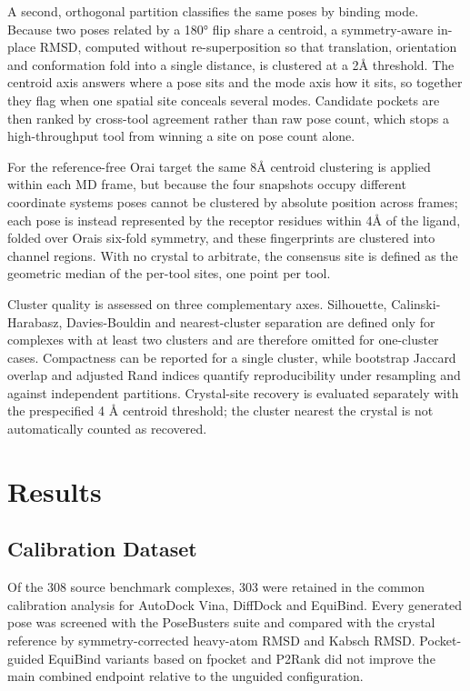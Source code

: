 A second, orthogonal partition classifies the same poses by binding mode. Because two poses related by a 180° flip share a centroid, a symmetry-aware in-place RMSD, computed without re-superposition so that translation, orientation and conformation fold into a single distance, is clustered at a 2Å threshold. The centroid axis answers where a pose sits and the mode axis how it sits, so together they flag when one spatial site conceals several modes. Candidate pockets are then ranked by cross-tool agreement rather than raw pose count, which stops a high-throughput tool from winning a site on pose count alone.

For the reference-free Orai target the same 8Å centroid clustering is applied within each MD frame, but because the four snapshots occupy different coordinate systems poses cannot be clustered by absolute position across frames; each pose is instead represented by the receptor residues within 4Å of the ligand, folded over Orai\textquotesingle s six-fold symmetry, and these fingerprints are clustered into channel regions. With no crystal to arbitrate, the consensus site is defined as the geometric median of the per-tool sites, one point per tool.

Cluster quality is assessed on three complementary axes. Silhouette, Calinski-Harabasz, Davies-Bouldin and nearest-cluster separation are defined only for complexes with at least two clusters and are therefore omitted for one-cluster cases. Compactness can be reported for a single cluster, while bootstrap Jaccard overlap and adjusted Rand indices quantify reproducibility under resampling and against independent partitions. Crystal-site recovery is evaluated separately with the prespecified 4 Å centroid threshold; the cluster nearest the crystal is not automatically counted as recovered.

\hypertarget{results}{%
\chapter{Results}\label{results}}

\hypertarget{calibration-dataset-1}{%
\section{Calibration Dataset}\label{calibration-dataset-1}}

Of the 308 source benchmark complexes, 303 were retained in the common calibration analysis for AutoDock Vina, DiffDock and EquiBind. Every generated pose was screened with the PoseBusters suite and compared with the crystal reference by symmetry-corrected heavy-atom RMSD and Kabsch RMSD. Pocket-guided EquiBind variants based on fpocket and P2Rank did not improve the main combined endpoint relative to the unguided configuration.

